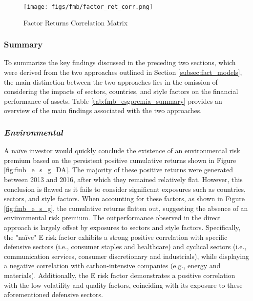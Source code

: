 \documentclass[11pt,a4paper]{article}
\begin{document}
\clearpage

\begin{figure}[h!] 
    \centering
    \texttt{[image: figs/fmb/factor\_ret\_corr.png]} 
    \caption{Factor Returns Correlation Matrix}
    \label{fig:fmb_factor_ret_corr}
\end{figure}

\clearpage

\subsubsection{Summary}

To summarize the key findings discussed in the preceding two sections, which were derived from the two approaches outlined in Section \ref{subsec:fact_models}, the main distinction between the two approaches lies in the omission of considering the impacts of sectors, countries, and style factors on the financial performance of assets.
Table \ref{tab:fmb_esgpremia_summary} provides an overview of the main findings associated with the two approaches.

\begin{center}
    
    \label{tab:fmb_esgpremia_summary}   
\end{center}

\subsubsection*{\textit{Environmental}}

A naïve investor would quickly conclude the existence of an environmental risk premium based on the persistent positive cumulative returns shown in Figure \ref{fig:fmb_e_s_g_DA}. 
The majority of these positive returns were generated between 2013 and 2016, after which they remained relatively flat.
However, this conclusion is flawed as it fails to consider significant exposures such as countries, sectors, and style factors. 
When accounting for these factors, as shown in Figure \ref{fig:fmb_e_s_g}, the cumulative returns flatten out, suggesting the absence of an environmental risk premium.
The outperformance observed in the direct approach is largely offset by exposures to sectors and style factors.
Specifically, the "naïve" E risk factor exhibits a strong positive correlation with specific defensive sectors (i.e., consumer staples and healthcare) and cyclical sectors (i.e., communication services, consumer discretionary and industrials), while displaying a negative correlation with carbon-intensive companies (e.g., energy and materials). 
Additionally, the E risk factor demonstrates a positive correlation with the low volatility and quality factors, coinciding with its exposure to these aforementioned defensive sectors. 
\end{document}
